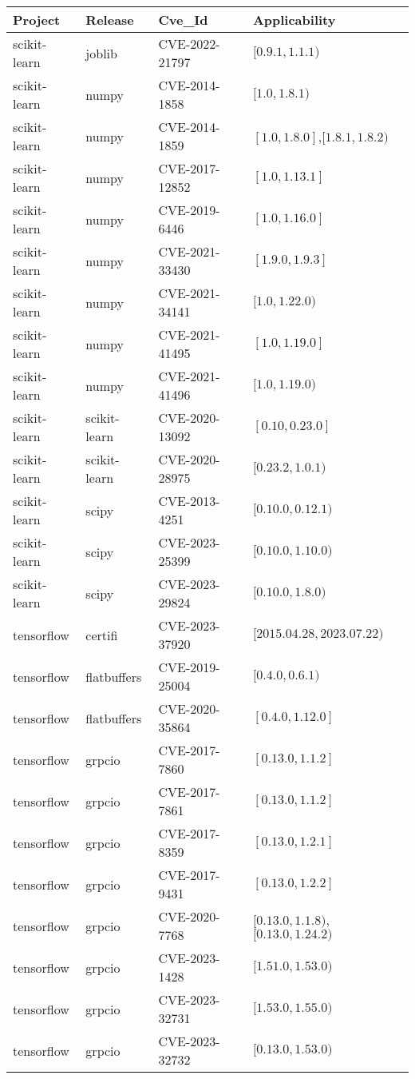 \begin{tabular}{llll}
\toprule
Project & Release & Cve_Id & Applicability \\
\midrule
scikit-learn & joblib & CVE-2022-21797 & $[0.9.1,1.1.1)$ \\
scikit-learn & numpy & CVE-2014-1858 & $[1.0,1.8.1)$ \\
scikit-learn & numpy & CVE-2014-1859 & $[1.0,1.8.0]$,$[1.8.1,1.8.2)$ \\
scikit-learn & numpy & CVE-2017-12852 & $[1.0,1.13.1]$ \\
scikit-learn & numpy & CVE-2019-6446 & $[1.0,1.16.0]$ \\
scikit-learn & numpy & CVE-2021-33430 & $[1.9.0,1.9.3]$ \\
scikit-learn & numpy & CVE-2021-34141 & $[1.0,1.22.0)$ \\
scikit-learn & numpy & CVE-2021-41495 & $[1.0,1.19.0]$ \\
scikit-learn & numpy & CVE-2021-41496 & $[1.0,1.19.0)$ \\
scikit-learn & scikit-learn & CVE-2020-13092 & $[0.10,0.23.0]$ \\
scikit-learn & scikit-learn & CVE-2020-28975 & $[0.23.2,1.0.1)$ \\
scikit-learn & scipy & CVE-2013-4251 & $[0.10.0,0.12.1)$ \\
scikit-learn & scipy & CVE-2023-25399 & $[0.10.0,1.10.0)$ \\
scikit-learn & scipy & CVE-2023-29824 & $[0.10.0,1.8.0)$ \\
tensorflow & certifi & CVE-2023-37920 & $[2015.04.28,2023.07.22)$ \\
tensorflow & flatbuffers & CVE-2019-25004 & $[0.4.0,0.6.1)$ \\
tensorflow & flatbuffers & CVE-2020-35864 & $[0.4.0,1.12.0]$ \\
tensorflow & grpcio & CVE-2017-7860 & $[0.13.0,1.1.2]$ \\
tensorflow & grpcio & CVE-2017-7861 & $[0.13.0,1.1.2]$ \\
tensorflow & grpcio & CVE-2017-8359 & $[0.13.0,1.2.1]$ \\
tensorflow & grpcio & CVE-2017-9431 & $[0.13.0,1.2.2]$ \\
tensorflow & grpcio & CVE-2020-7768 & $[0.13.0,1.1.8)$,$[0.13.0,1.24.2)$ \\
tensorflow & grpcio & CVE-2023-1428 & $[1.51.0,1.53.0)$ \\
tensorflow & grpcio & CVE-2023-32731 & $[1.53.0,1.55.0)$ \\
tensorflow & grpcio & CVE-2023-32732 & $[0.13.0,1.53.0)$ \\

\end{tabular}
